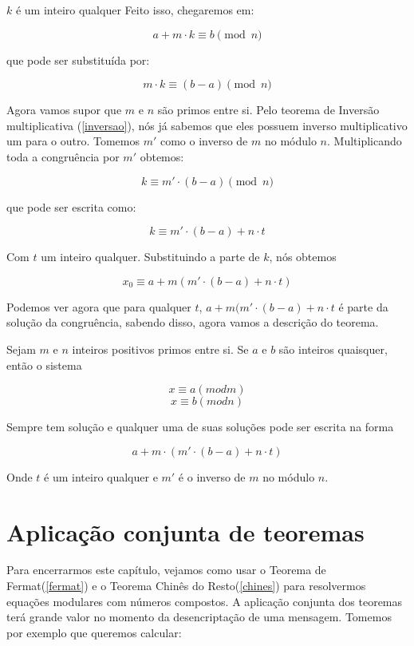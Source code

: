 $k$ \'e um inteiro qualquer Feito isso, chegaremos em:

$$a + m\cdot k \equiv b \pmod{n}$$

que pode ser substitu\'ida por:

$$ m\cdot k \equiv (b-a) \pmod{n}$$

Agora vamos supor que $m$ e $n$ s\~ao primos entre si. Pelo teorema de Invers\~ao multiplicativa (\ref{inversao}), n\'os j\'a sabemos que eles possuem inverso multiplicativo um para o outro. Tomemos $m'$ como o inverso de $m$ no m\'odulo $n$. Multiplicando toda a congru\^encia por $m'$ obtemos:

$$ k \equiv m'\cdot(b-a) \pmod{n}$$

que pode ser escrita como:

$$ k \equiv m'\cdot(b-a)+n \cdot t$$


Com $t$ um inteiro qualquer. Substituindo a parte de $k$, n\'os obtemos

$$ x_0 \equiv a + m (m'\cdot(b-a)+n \cdot t) $$


Podemos ver agora que para qualquer $t$, $a + m (m'\cdot(b-a)+n \cdot t$ \'e parte da solu\c{c}\~ao da congru\^encia, sabendo disso, agora vamos a descri\c{c}\~ao do teorema.


\begin{Th}\label{chines}

Sejam $m$ e $n$ inteiros positivos primos entre si. Se $a$ e $b$ s\~ao inteiros quaisquer, ent\~ao o sistema

$$ x \equiv a (mod m) $$
$$ x \equiv b (mod n) $$

Sempre tem solu\c{c}\~ao e qualquer uma de suas solu\c{c}\~oes pode ser escrita na forma

$$ a + m \cdot(m' \cdot (b-a) + n \cdot t) $$

Onde $t$ \'e um inteiro qualquer e $m'$ \'e o inverso de $m$ no m\'odulo $n$.

\end{Th}

\section{Aplica\c{c}\~ao conjunta de teoremas}

\hspace{7mm}Para encerrarmos este cap\'itulo, vejamos como usar o Teorema de Fermat(\ref{fermat}) e o Teorema Chin\^es do Resto(\ref{chines}) para resolvermos equa\c{c}\~oes modulares com n\'umeros compostos. A aplica\c{c}\~ao conjunta dos teoremas ter\'a grande valor no momento da desencripta\c{c}\~ao de uma mensagem. Tomemos por exemplo que queremos calcular:

